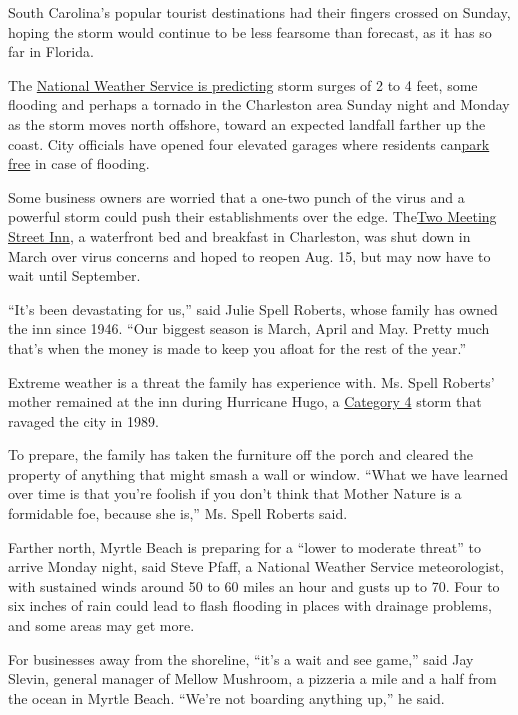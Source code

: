 South Carolina's popular tourist destinations had their fingers crossed
on Sunday, hoping the storm would continue to be less fearsome than
forecast, as it has so far in Florida.

The \href{https://www.facebookcorewwwi.onion/NWSCharlestonSC}{National
Weather Service is predicting} storm surges of 2 to 4 feet, some
flooding and perhaps a tornado in the Charleston area Sunday night and
Monday as the storm moves north offshore, toward an expected landfall
farther up the coast. City officials have opened four elevated garages
where residents
can\href{https://charleston-sc.maps.arcgis.com/apps/MapSeries/index.html?appid=61d5ee562990480f922de9695872cd19}{park
free} in case of flooding.

Some business owners are worried that a one-two punch of the virus and a
powerful storm could push their establishments over the edge.
The\href{https://www.twomeetingstreetinn.com/}{Two Meeting Street Inn},
a waterfront bed and breakfast in Charleston, was shut down in March
over virus concerns and hoped to reopen Aug. 15, but may now have to
wait until September.

``It's been devastating for us,'' said Julie Spell Roberts, whose family
has owned the inn since 1946. ``Our biggest season is March, April and
May. Pretty much that's when the money is made to keep you afloat for
the rest of the year.''

Extreme weather is a threat the family has experience with. Ms. Spell
Roberts' mother remained at the inn during Hurricane Hugo, a
\href{https://www.weather.gov/chs/Hugo-30thAnniversary}{Category 4}
storm that ravaged the city in 1989.

To prepare, the family has taken the furniture off the porch and cleared
the property of anything that might smash a wall or window. ``What we
have learned over time is that you're foolish if you don't think that
Mother Nature is a formidable foe, because she is,'' Ms. Spell Roberts
said.

Farther north, Myrtle Beach is preparing for a ``lower to moderate
threat'' to arrive Monday night, said Steve Pfaff, a National Weather
Service meteorologist, with sustained winds around 50 to 60 miles an
hour and gusts up to 70. Four to six inches of rain could lead to flash
flooding in places with drainage problems, and some areas may get more.

For businesses away from the shoreline, ``it's a wait and see game,''
said Jay Slevin, general manager of Mellow Mushroom, a pizzeria a mile
and a half from the ocean in Myrtle Beach. ``We're not boarding anything
up,'' he said.

